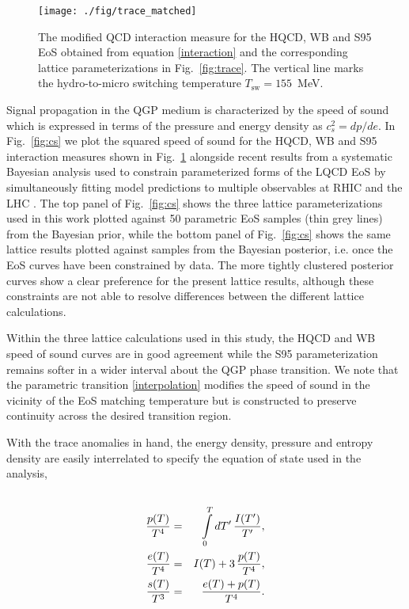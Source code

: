 \documentclass[aps,prc,reprint,amsmath,nofootinbib,superscriptaddress]{revtex4-1}
\begin{document}
\begin{figure}[t]
  \texttt{[image: ./fig/trace\_matched]}
  \caption{\label{fig:trace_final} The modified QCD interaction measure for the HQCD, WB and S95 EoS obtained from equation \eqref{interaction} and the corresponding lattice
	  parameterizations in Fig.~\ref{fig:trace}. The vertical line marks the hydro-to-micro switching temperature $T_\text{sw} = 155$~MeV.}
\end{figure}

Signal propagation in the QGP medium is characterized by the speed of sound which is expressed in terms of the pressure and energy density as $c_s^2 = dp/de$.
In Fig.~\ref{fig:cs} we plot the squared speed of sound for the HQCD, WB and S95 interaction measures shown in Fig.~\ref{fig:trace_final} alongside recent results from a systematic Bayesian analysis used to constrain parameterized forms of the LQCD EoS by simultaneously fitting model predictions to multiple observables at RHIC and the LHC \cite{Pratt:2015zsa}. 
The top panel of Fig.~\ref{fig:cs} shows the three lattice parameterizations used in this work plotted against 50 parametric EoS samples (thin grey lines) from the Bayesian prior, while the bottom panel of Fig.~\ref{fig:cs} shows the same lattice results plotted against samples from the Bayesian posterior, i.e. once the EoS curves have been constrained by data. The more tightly clustered posterior curves show a clear preference for the present lattice results, although these constraints are not able to resolve differences between the different lattice calculations.

Within the three lattice calculations used in this study, the HQCD and WB speed of sound curves are in good agreement while the S95 parameterization remains softer in a wider interval about the QGP phase transition. We note that the parametric transition \eqref{interpolation} modifies the speed of sound in the vicinity of the EoS matching temperature but is constructed to preserve continuity across the desired transition region.

With the trace anomalies in hand, the energy density, pressure and entropy density are easily interrelated to specify the equation of state used in the analysis,
\begin{eqnarray}
 \label{conversion}
 \cr \frac{p(T)}{T^4} &=& \int\limits_0^T dT'\, \frac{I(T')}{T'}, \\
 \frac{e(T)}{T^4} &=& I(T) + 3\, \frac{p(T)}{T^4}, \\
 \frac{s(T)}{T^3} &=& \frac{e(T) + p(T)}{T^4}. 
\end{eqnarray}
 
\end{document}
